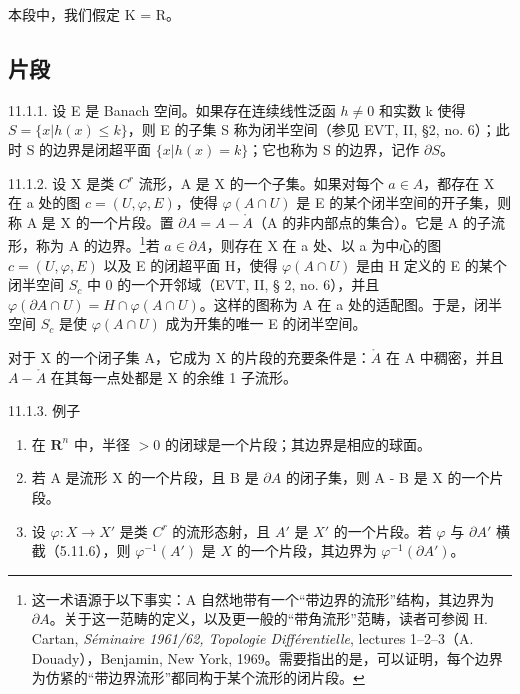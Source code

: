 本段中，我们假定 K = R。

\subsection{片段}

11.1.1. 设 E 是 Banach 空间。如果存在连续线性泛函 \(h \neq 0\) 和实数 k 使得 \(S = \{x|h(x) \leqslant k\}\)，则 E 的子集 S 称为闭半空间（参见 EVT, II, §2, no. 6）；此时 S 的边界是闭超平面 \(\{x|h(x) = k\}\)；它也称为 S 的边界，记作 \(\partial S\)。

11.1.2. 设 X 是类 \(C^{r}\) 流形，A 是 X 的一个子集。如果对每个 \(a \in A\)，都存在 X 在 a 处的图 \(c = (U, \varphi, E)\)，使得 \(\varphi(A \cap U)\) 是 E 的某个闭半空间的开子集，则称 A 是 X 的一个片段。置 \(\partial A = A - \mathring{A}\)（A 的非内部点的集合）。它是 A 的子流形，称为 A 的边界。\footnote{这一术语源于以下事实：A 自然地带有一个“带边界的流形”结构，其边界为 \(\partial A\)。关于这一范畴的定义，以及更一般的“带角流形”范畴，读者可参阅 H. Cartan, \emph{Séminaire 1961/62, Topologie Différentielle}, lectures 1–2–3（A. Douady），Benjamin, New York, 1969。需要指出的是，可以证明，每个边界为仿紧的“带边界流形”都同构于某个流形的闭片段。}若 \(a \in \partial A\)，则存在 X 在 a 处、以 a 为中心的图 \(c = (U, \varphi, E)\) 以及 E 的闭超平面 H，使得 \(\varphi(A \cap U)\) 是由 H 定义的 E 的某个闭半空间 \(S_{c}\) 中 0 的一个开邻域（EVT, II, § 2, no. 6），并且 \(\varphi(\partial A \cap U) = H \cap \varphi(A \cap U)\)。这样的图称为 A 在 a 处的适配图。于是，闭半空间 \(S_{c}\) 是使 \(\varphi(A \cap U)\) 成为开集的唯一 E 的闭半空间。

对于 X 的一个闭子集 A，它成为 X 的片段的充要条件是：\(\mathring{A}\) 在 A 中稠密，并且 \(A-\mathring{A}\) 在其每一点处都是 X 的余维 1 子流形。

11.1.3. 例子

\begin{enumerate}
\def\labelenumi{\alph{enumi})}
\item
  在 \(\mathbf{R}^{n}\) 中，半径 \(>0\) 的闭球是一个片段；其边界是相应的球面。
\item
  若 A 是流形 X 的一个片段，且 B 是 \(\partial A\) 的闭子集，则 A - B 是 X 的一个片段。
\item
  设 \(\varphi: X \to X'\) 是类 \(C^r\) 的流形态射，且 \(A'\) 是 \(X'\) 的一个片段。若 \(\varphi\) 与 \(\partial A'\) 横截（5.11.6），则 \(\varphi^{-1}(A')\) 是 \(X\) 的一个片段，其边界为 \(\varphi^{-1}(\partial A')\)。
\end{enumerate}

